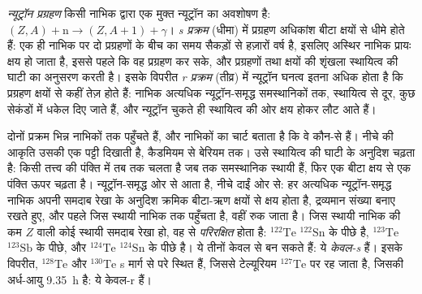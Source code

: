 \begin{definition}[न्यूट्रॉन प्रग्रहण; s प्रक्रम; r प्रक्रम]\label{def:b3:origin-of-elements:s-process}
\emph{न्यूट्रॉन प्रग्रहण} किसी नाभिक द्वारा एक
मुक्त न्यूट्रॉन का अवशोषण है: $(Z, A) + \mathrm{n} \to (Z, A+1) + \gamma$।
\emph{s प्रक्रम} (धीमा) में प्रग्रहण
अधिकांश बीटा क्षयों से धीमे होते हैं: एक ही नाभिक पर दो प्रग्रहणों के बीच का
समय सैकड़ों से हज़ारों वर्ष है, इसलिए अस्थिर नाभिक प्रायः क्षय हो जाता है,
इससे पहले कि वह प्रग्रहण कर सके, और प्रग्रहणों तथा क्षयों की शृंखला
स्थायित्व की घाटी का अनुसरण करती है। इसके विपरीत
\emph{r प्रक्रम} (तीव्र) में न्यूट्रॉन घनत्व
इतना अधिक होता है कि प्रग्रहण क्षयों से कहीं तेज़ होते हैं: नाभिक
अत्यधिक न्यूट्रॉन-समृद्ध समस्थानिकों तक, स्थायित्व से दूर, कुछ
सेकंडों में धकेल दिए जाते हैं, और न्यूट्रॉन चुकते ही स्थायित्व की ओर क्षय होकर लौट आते हैं।
\end{definition}

दोनों प्रक्रम भिन्न नाभिकों तक पहुँचते हैं, और नाभिकों का चार्ट
बताता है कि वे कौन-से हैं। नीचे की आकृति उसकी एक पट्टी दिखाती है, कैडमियम से
बेरियम तक।  उसे स्थायित्व की घाटी के अनुदिश चढ़ता है: किसी तत्त्व की
पंक्ति में तब तक चलता है जब तक समस्थानिक स्थायी हैं, फिर एक बीटा क्षय से
एक पंक्ति ऊपर चढ़ता है।  न्यूट्रॉन-समृद्ध ओर से आता है, नीचे दाईं ओर से:
हर अत्यधिक न्यूट्रॉन-समृद्ध नाभिक अपनी समदाब रेखा के अनुदिश क्रमिक बीटा-ऋण क्षयों से क्षय होता है,
द्रव्यमान संख्या बनाए रखते हुए, और पहले जिस स्थायी नाभिक तक पहुँचता है,
वहीं रुक जाता है। जिस स्थायी नाभिक की कम $Z$ वाली कोई स्थायी समदाब रेखा हो,
वह  से \emph{परिरक्षित} होता है: $^{122}\mathrm{Te}$
$^{122}\mathrm{Sn}$ के पीछे है, $^{123}\mathrm{Te}$ $^{123}\mathrm{Sb}$ के पीछे,
और $^{124}\mathrm{Te}$ $^{124}\mathrm{Sn}$ के पीछे है।
ये तीनों केवल  से बन सकते हैं: ये
\emph{केवल-s} हैं। इसके विपरीत, $^{128}\mathrm{Te}$ और $^{130}\mathrm{Te}$
s मार्ग से परे स्थित हैं, जिससे टेल्यूरियम $^{127}\mathrm{Te}$ पर रह जाता है,
जिसकी अर्ध-आयु \qty{9.35}{h} है: ये केवल-r हैं।

